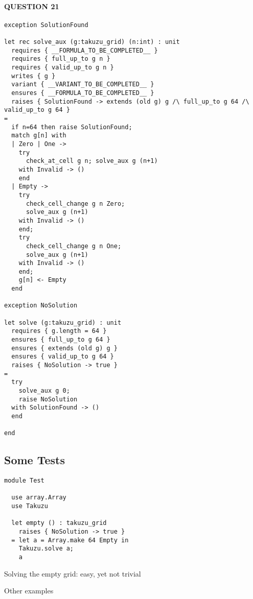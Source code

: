 \hypertarget{question-21}{%
\paragraph{QUESTION 21}\label{question-21}}

\begin{verbatim}
exception SolutionFound

let rec solve_aux (g:takuzu_grid) (n:int) : unit
  requires { __FORMULA_TO_BE_COMPLETED__ }
  requires { full_up_to g n }
  requires { valid_up_to g n }
  writes { g }
  variant { __VARIANT_TO_BE_COMPLETED__ }
  ensures { __FORMULA_TO_BE_COMPLETED__ }
  raises { SolutionFound -> extends (old g) g /\ full_up_to g 64 /\ valid_up_to g 64 }
=
  if n=64 then raise SolutionFound;
  match g[n] with
  | Zero | One ->
    try
      check_at_cell g n; solve_aux g (n+1)
    with Invalid -> ()
    end
  | Empty ->
    try
      check_cell_change g n Zero;
      solve_aux g (n+1)
    with Invalid -> ()
    end;
    try
      check_cell_change g n One;
      solve_aux g (n+1)
    with Invalid -> ()
    end;
    g[n] <- Empty
  end

exception NoSolution

let solve (g:takuzu_grid) : unit
  requires { g.length = 64 }
  ensures { full_up_to g 64 }
  ensures { extends (old g) g }
  ensures { valid_up_to g 64 }
  raises { NoSolution -> true }
=
  try
    solve_aux g 0;
    raise NoSolution
  with SolutionFound -> ()
  end

end
\end{verbatim}

\hypertarget{some-tests}{%
\subsection{Some Tests}\label{some-tests}}

\begin{verbatim}
module Test

  use array.Array
  use Takuzu

  let empty () : takuzu_grid
    raises { NoSolution -> true }
  = let a = Array.make 64 Empty in
    Takuzu.solve a;
    a
\end{verbatim}

Solving the empty grid: easy, yet not trivial

Other examples


